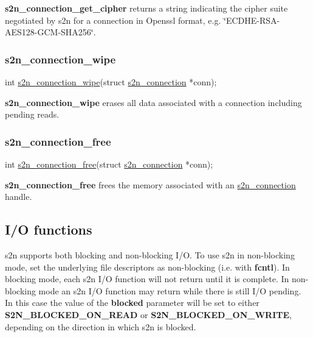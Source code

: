 {\bfseries s2n\+\_\+connection\+\_\+get\+\_\+cipher} returns a string indicating the cipher suite negotiated by s2n for a connection in Openssl format, e.\+g. \char`\"{}\+E\+C\+D\+H\+E-\/\+R\+S\+A-\/\+A\+E\+S128-\/\+G\+C\+M-\/\+S\+H\+A256\char`\"{}.

\subsubsection*{s2n\+\_\+connection\+\_\+wipe}


\begin{DoxyCode}
\textcolor{keywordtype}{int} \hyperlink{s2n_8h_aa869211ca9b49f497cdb5579935203de}{s2n\_connection\_wipe}(\textcolor{keyword}{struct} \hyperlink{structs2n__connection}{s2n\_connection} *conn);
\end{DoxyCode}


{\bfseries s2n\+\_\+connection\+\_\+wipe} erases all data associated with a connection including pending reads.

\subsubsection*{s2n\+\_\+connection\+\_\+free}


\begin{DoxyCode}
\textcolor{keywordtype}{int} \hyperlink{s2n_8h_a03ed084d7fb943c7d32b13075ed8eff7}{s2n\_connection\_free}(\textcolor{keyword}{struct} \hyperlink{structs2n__connection}{s2n\_connection} *conn);
\end{DoxyCode}


{\bfseries s2n\+\_\+connection\+\_\+free} frees the memory associated with an \hyperlink{structs2n__connection}{s2n\+\_\+connection} handle.

\subsection*{I/O functions}

s2n supports both blocking and non-\/blocking I/O. To use s2n in non-\/blocking mode, set the underlying file descriptors as non-\/blocking (i.\+e. with {\bfseries fcntl}). In blocking mode, each s2n I/O function will not return until it is complete. In non-\/blocking mode an s2n I/O function may return while there is still I/O pending. In this case the value of the {\bfseries blocked} parameter will be set to either {\bfseries S2\+N\+\_\+\+B\+L\+O\+C\+K\+E\+D\+\_\+\+O\+N\+\_\+\+R\+E\+AD} or {\bfseries S2\+N\+\_\+\+B\+L\+O\+C\+K\+E\+D\+\_\+\+O\+N\+\_\+\+W\+R\+I\+TE}, depending on the direction in which s2n is blocked.

